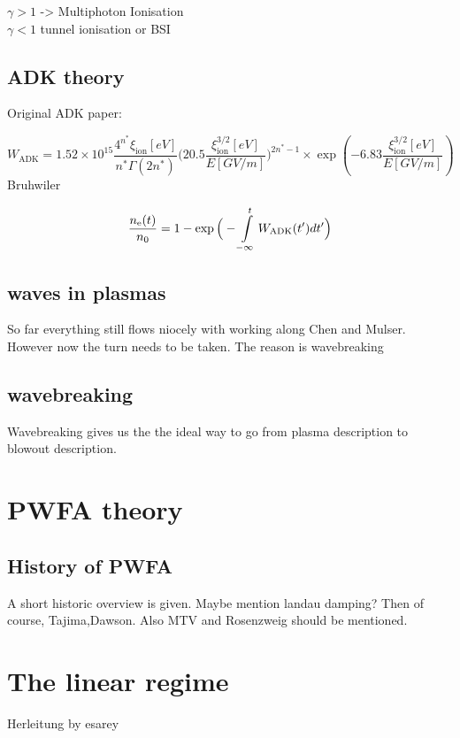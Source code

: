 $\gamma >1 $ -> Multiphoton Ionisation\\
$\gamma < 1$ tunnel ionisation or BSI

\subsection{ADK theory}
Original ADK paper: \cite{ADK_original}

\begin{equation}
W_\mathrm{ADK}=1.52\times 10^{15}\frac{4^{n^*}\xi_\mathrm{ion}[eV]}{n^*\Gamma(2n^*)}\Big(20.5\frac{\xi_\mathrm{ion}^{3/2}[eV]}{E[GV/m]}\Big)^{2n^*-1}\times \exp(-6.83\frac{\xi_\mathrm{ion}^{3/2}[eV]}{E[GV/m]})
\label{eqn:ADK_Bruhwiler}
\end{equation}
Bruhwiler\cite{bruhwiler2003PoP}
	
\begin{equation}
\frac{n_\mathrm{e}(t)}{n_0} =1-\exp\Big(-\int \limits_{-\infty}^t W_\mathrm{ADK}(t')dt'\Big)
\end{equation}

\subsection{waves in plasmas}
So far everything still flows niocely with working along Chen and Mulser. However now the turn needs to be taken.
The reason is wavebreaking
\subsection{wavebreaking}
Wavebreaking gives us the the ideal way to go from plasma description to blowout description.
\section{PWFA theory}
\subsection{History of PWFA}
A short historic overview is given. 
Maybe mention landau damping? Then of course, Tajima,Dawson. Also MTV and Rosenzweig should be mentioned.
\section{The linear regime}
Herleitung by esarey \cite{RevModPhys.81.1229}


